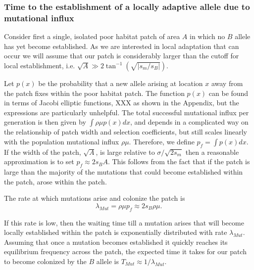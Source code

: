 \documentclass{article}
\begin{document}

\subsubsection{Time to the establishment of a locally adaptive allele
  due to mutational influx}
\label{ss:patchymutation}
Consider first a single, isolated poor habitat patch of area $A$ in
which no $B$ allele has yet become established. As
we are interested in local adaptation that can occur we will assume
that our patch is considerably larger than the cutoff for local
establishment, i.e. $\sqrt{A} \gg 2 \tan^{-1} (\sqrt{|s_m/s_B|})$.

Let $p(x)$ be the probability that a new allele arising at location
$x$ away from the patch fixes within the poor habitat patch.
The function $p(x)$ can be found in terms of Jacobi elliptic functions,
XXX as shown in the Appendix, but the expressions are particularly unhelpful.
The total successful mutational influx per generation is then given by $\int \rho \mu p(x) dx$,
and depends in a complicated way on the relationship of patch width and selection coefficients,
but still scales linearly with the population mutational influx $\rho \mu$.
Therefore, we define $p_f = \int p(x) dx$.  If the width of the patch, $\sqrt{A}$, is large
relative to $\sigma/\sqrt{2s_m}$ then a reasonable approximation is to
set $p_f \approx 2 s_B A$. This follows from the fact that if the
patch is large than the majority of the mutations that could become
established within the patch, arose within the patch.  

The rate at which mutations arise and colonize the patch is
\begin{equation}
\lambda_{Mut} = \rho \mu p_f \approx 2 s_B \rho \mu.
\end{equation}

If this rate is low,  then the waiting time till a mutation arises that
will become locally established within the patch is exponentially
distributed with rate $\lambda_{Mut}$.  Assuming that once a mutation
becomes established
 it quickly reaches its equilibrium frequency across the patch, the
 expected time it takes for our patch to become colonized by the $B$
 allele is $T_{Mut} \approx 1/ \lambda_{Mut} $.
\end{document}
